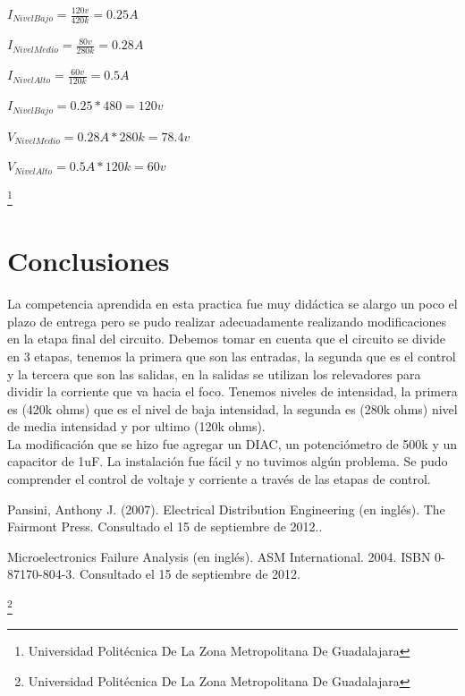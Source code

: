 \documentclass[10pt,a4paper]{article}
\begin{document}
$ I_{Nivel Bajo} = \frac{120v}{420k} = 0.25A $

$ I_{Nivel Medio} = \frac{80v}{280k} = 0.28A $

$ I_{Nivel Alto} = \frac{60v}{120k} = 0.5A $

$ I_{Nivel Bajo} = 0.25 * 480 = 120v $

$ V_{Nivel Medio} = 0.28A * 280k = 78.4v $

$ V_{Nivel Alto} = 0.5A * 120k = 60v $


\footnote{Universidad Politécnica De La Zona Metropolitana De Guadalajara}


\section{Conclusiones}

La competencia aprendida en esta practica fue muy didáctica se alargo un poco el plazo de entrega pero se pudo realizar adecuadamente realizando modificaciones en la etapa final del circuito. Debemos tomar en cuenta que el circuito se divide en 3 etapas, tenemos la primera que son las entradas, la segunda que es el control y la tercera que son las salidas, en la salidas se utilizan los relevadores para dividir la corriente que va hacia el foco. Tenemos niveles de intensidad, la primera es (420k ohms) que es el nivel de baja intensidad, la segunda es (280k ohms) nivel de media intensidad y por ultimo (120k ohms).\\

La modificación que se hizo fue agregar un DIAC, un potenciómetro de 500k y un capacitor de 1uF. La instalación fue fácil y no tuvimos algún problema. Se pudo comprender el control de voltaje y corriente a través de las etapas de control.


\begin{thebibliography}{X}
 Pansini, Anthony J. (2007). Electrical Distribution Engineering (en inglés). The Fairmont Press. Consultado el 15 de septiembre de 2012..


  Microelectronics Failure Analysis (en inglés). ASM International. 2004. ISBN 0-87170-804-3. Consultado el 15 de septiembre de 2012.
\end{thebibliography}


\footnote{Universidad Politécnica De La Zona Metropolitana De Guadalajara}
\end{document}
